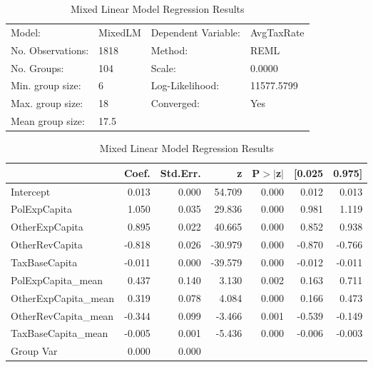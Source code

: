\begin{table}[H]
\caption{Mixed Linear Model Regression Results}
\label{}
\begin{center}
\begin{tabular}{llll}
\hline
Model:            & MixedLM & Dependent Variable: & AvgTaxRate  \\
No. Observations: & 1818    & Method:             & REML        \\
No. Groups:       & 104     & Scale:              & 0.0000      \\
Min. group size:  & 6       & Log-Likelihood:     & 11577.5799  \\
Max. group size:  & 18      & Converged:          & Yes         \\
Mean group size:  & 17.5    &                     &             \\
\hline
\end{tabular}
\end{center}

\begin{center}
\begin{tabular}{lrrrrrr}
\hline
                     &  Coef. & Std.Err. &       z & P$> |$z$|$ & [0.025 & 0.975]  \\
\hline
Intercept            &  0.013 &    0.000 &  54.709 &       0.000 &  0.012 &  0.013  \\
PolExpCapita         &  1.050 &    0.035 &  29.836 &       0.000 &  0.981 &  1.119  \\
OtherExpCapita       &  0.895 &    0.022 &  40.665 &       0.000 &  0.852 &  0.938  \\
OtherRevCapita       & -0.818 &    0.026 & -30.979 &       0.000 & -0.870 & -0.766  \\
TaxBaseCapita        & -0.011 &    0.000 & -39.579 &       0.000 & -0.012 & -0.011  \\
PolExpCapita\_mean   &  0.437 &    0.140 &   3.130 &       0.002 &  0.163 &  0.711  \\
OtherExpCapita\_mean &  0.319 &    0.078 &   4.084 &       0.000 &  0.166 &  0.473  \\
OtherRevCapita\_mean & -0.344 &    0.099 &  -3.466 &       0.001 & -0.539 & -0.149  \\
TaxBaseCapita\_mean  & -0.005 &    0.001 &  -5.436 &       0.000 & -0.006 & -0.003  \\
Group Var            &  0.000 &    0.000 &         &             &        &         \\
\hline
\end{tabular}
\end{center}
\end{table}
\bigskip
